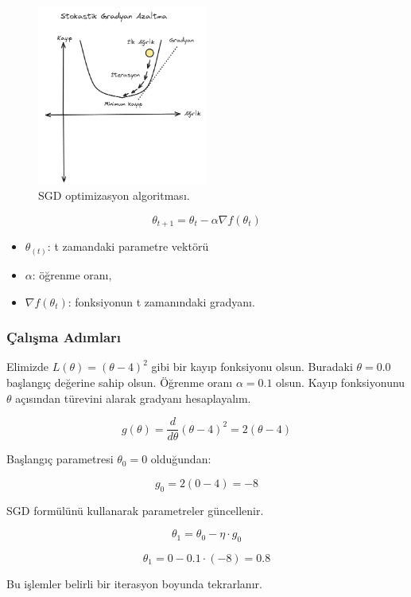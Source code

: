\begin{figure}[h]
    \centering
    \includegraphics[width=0.5\textwidth]{images/sgd_optimizer.png}
    \caption{SGD optimizasyon algoritması.}
    \label{fig:enter-label}
\end{figure}


\[\theta_{t+1} = \theta_{t} - \alpha \nabla f(\theta_{t})\]

\begin{itemize}
	\item $\theta_(t)$: t zamandaki parametre vektörü
	\item $\alpha$: öğrenme oranı,
	\item $\nabla f(\theta_{t})$: fonksiyonun t zamanındaki gradyanı.
\end{itemize}

\subsubsection{Çalışma Adımları}

Elimizde $L(\theta) = (\theta - 4)^2$ gibi bir kayıp fonksiyonu olsun. Buradaki $\theta = 0.0$ başlangıç değerine sahip olsun.  Öğrenme oranı $\alpha = 0.1$ olsun. Kayıp fonksiyonunu $\theta$ açısından türevini alarak gradyanı hesaplayalım.

\[ g(\theta) = \frac{d}{d \theta} (\theta - 4)^2 = 2 (\theta - 4) \]

Başlangıç parametresi $\theta_0 = 0$ olduğundan:

\[ g_0 = 2 (0 - 4) = -8 \]

SGD formülünü kullanarak parametreler güncellenir.

\[ \theta_1 = \theta_0 - \eta \cdot g_0 \]

\[ \theta_1 = 0 - 0.1 \cdot (-8) = 0.8 \]

Bu işlemler belirli bir iterasyon boyunda tekrarlanır.

